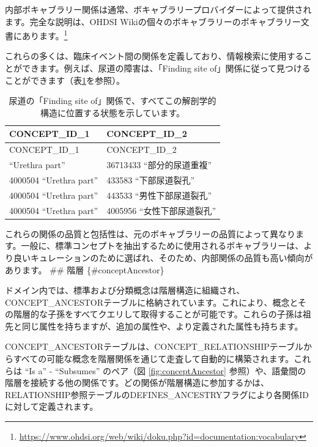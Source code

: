 \documentclass[
  11pt]{book}
\theoremstyle{definition}
\theoremstyle{definition}
\theoremstyle{definition}
\theoremstyle{definition}
\theoremstyle{remark}
\begin{document}
内部ボキャブラリー関係は通常、ボキャブラリープロバイダーによって提供されます。完全な説明は、OHDSI Wikiの個々のボキャブラリーのボキャブラリー文書にあります。\footnote{\url{https://www.ohdsi.org/web/wiki/doku.php?id=documentation:vocabulary}}

これらの多くは、臨床イベント間の関係を定義しており、情報検索に使用することができます。例えば、尿道の障害は、「Finding site of」関係に従って見つけることができます（表\ref{tab:findingSite}を参照）。

\begin{longtable}[]{@{}ll@{}}
\caption{\label{tab:findingSite} 尿道の「Finding site of」関係で、すべてこの解剖学的構造に位置する状態を示しています。}\tabularnewline
\toprule\noalign{}
CONCEPT\_ID\_1 & CONCEPT\_ID\_2 \\
\midrule\noalign{}
\endfirsthead
\toprule\noalign{}
CONCEPT\_ID\_1 & CONCEPT\_ID\_2 \\
\midrule\noalign{}
\endhead
\bottomrule\noalign{}
\endlastfoot
4000504 ``Urethra part'' & 36713433 ``部分的尿道重複'' \\
4000504 ``Urethra part'' & 433583 ``下部尿道裂孔'' \\
4000504 ``Urethra part'' & 443533 ``男性下部尿道裂孔'' \\
4000504 ``Urethra part'' & 4005956 ``女性下部尿道裂孔'' \\
\end{longtable}

これらの関係の品質と包括性は、元のボキャブラリーの品質によって異なります。一般に、標準コンセプトを抽出するために使用されるボキャブラリーは、より良いキュレーションのために選ばれ、そのため、内部関係の品質も高い傾向があります。
\#\# 階層 \{\#conceptAncestor\}

ドメイン内では、標準および分類概念は階層構造に組織され、CONCEPT\_ANCESTORテーブルに格納されています。これにより、概念とその階層的な子孫をすべてクエリして取得することが可能です。これらの子孫は祖先と同じ属性を持ちますが、追加の属性や、より定義された属性も持ちます。

CONCEPT\_ANCESTORテーブルは、CONCEPT\_RELATIONSHIPテーブルからすべての可能な概念を階層関係を通じて走査して自動的に構築されます。これらは ``Is a'' - ``Subsumes'' のペア（図 \ref{fig:conceptAncestor} 参照）や、語彙間の階層を接続する他の関係です。どの関係が階層構造に参加するかは、RELATIONSHIP参照テーブルのDEFINES\_ANCESTRYフラグにより各関係IDに対して定義されます。
\end{document}
